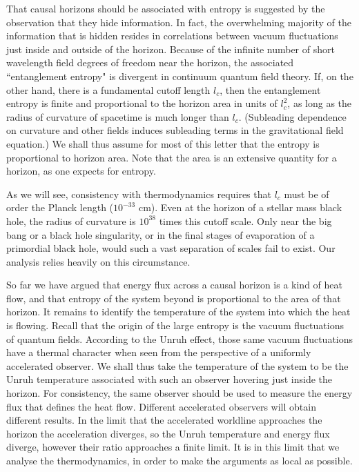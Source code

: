 That causal horizons should be associated with entropy is suggested
by the observation that they hide information\cite{bek}.
In fact, the overwhelming majority of the
information that is hidden resides
in correlations between vacuum fluctuations just inside and outside
of the horizon\cite{tangle}.
Because of the infinite number of short wavelength field degrees of
freedom near the horizon, the associated ``entanglement entropy" is divergent
in continuum quantum field theory. If, on the other hand, there is a
fundamental cutoff length $l_c$, then the entanglement entropy
is finite and proportional to the horizon area in units of $l_c^2$,
as long as the radius
of curvature of spacetime is much longer than $l_c$.
(Subleading dependence on curvature
and other fields induces subleading terms in the gravitational
field equation.)
We shall thus assume for most of this letter
that the entropy is proportional to horizon area.
Note that the area is an extensive quantity for a horizon,
as one expects for entropy\cite{holo}.

As we will see, consistency with thermodynamics requires that
$l_c$ must be of order the Planck length ($10^{-33}$ cm). Even
at the horizon of a stellar mass black hole, the radius of curvature
is $10^{38}$ times this cutoff scale. Only near the big bang or
a black hole singularity, or in the final stages of evaporation
of a primordial black hole, would such a vast separation of scales
fail to exist. Our analysis relies heavily on this circumstance.

So far we have argued that energy flux across a causal horizon
is a kind of heat flow, and that entropy of the system beyond
is proportional to the area of that horizon.
It remains to identify the temperature of the system
into which the heat is flowing. Recall that the origin of
the large entropy is the vacuum fluctuations of quantum fields. According
to the Unruh effect\cite{unruh},
those same vacuum fluctuations have a thermal
character when seen from the perspective of a uniformly accelerated
observer. We shall thus take the temperature of the system to be the
Unruh temperature associated with such an observer
hovering just inside the horizon. For consistency, the same
observer should be used to measure the energy flux that defines the
heat flow. Different accelerated observers will obtain
different results. In the limit that the accelerated worldline approaches
the horizon the acceleration diverges, so the Unruh temperature
and energy flux diverge, however their ratio approaches a finite limit.
It is in this limit that we analyse the thermodynamics, in order to
make the arguments as local as possible.

